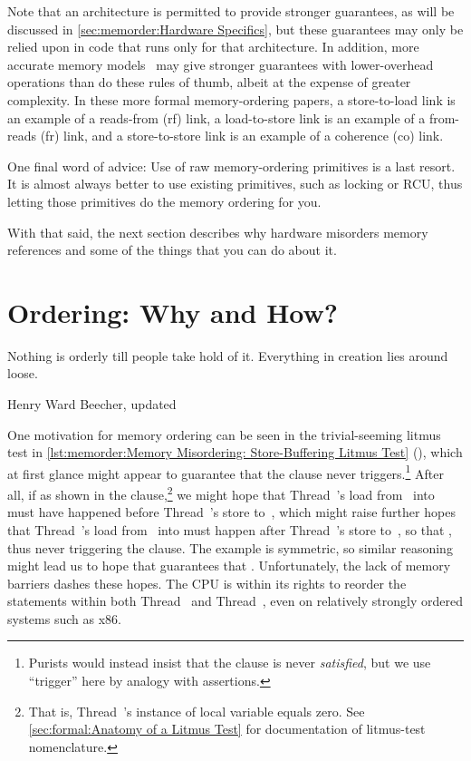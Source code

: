 Note that an architecture is permitted to provide stronger guarantees, as
will be discussed in
\cref{sec:memorder:Hardware Specifics},
but these guarantees may only be relied upon in code that runs only for
that architecture.
In addition, more accurate memory models~\cite{Alglave:2018:FSC:3173162.3177156}
may give stronger guarantees with lower-overhead operations than do
these rules of thumb, albeit at the expense of greater complexity.
In these more formal memory-ordering papers, a store-to-load link is an
example of a reads-from (rf) link, a load-to-store link is an example
of a from-reads (fr) link, and a store-to-store link is an example of
a coherence (co) link.

One final word of advice:
Use of raw memory-ordering primitives is a last resort.
It is almost always better to use existing primitives, such as locking
or RCU, thus letting those primitives do the memory ordering for you.

With that said, the next section describes why hardware misorders memory
references and some of the things that you can do about it.

\section{Ordering:
		   Why and How?}
\label{sec:memorder:Ordering: Why and How?}
%
\epigraph{Nothing is orderly till people take hold of it.
	  Everything in creation lies around loose.}
	 {Henry Ward Beecher, updated}

One motivation for memory ordering can be seen in the trivial-seeming
litmus test in
\cref{lst:memorder:Memory Misordering: Store-Buffering Litmus Test}
(),
which at first glance might
appear to guarantee that the  clause never triggers.\footnote{
	Purists would instead insist that the  clause is
	never \emph{satisfied}, but we use ``trigger'' here by
	analogy with assertions.}
After all, if  as shown in the  clause,\footnote{
	That is, Thread~'s instance of local variable 
	equals zero.
	See \cref{sec:formal:Anatomy of a Litmus Test}
	for documentation of litmus-test nomenclature.}
we might hope that Thread~'s load from~ into 
must have happened before Thread~'s store to~, which
might raise further hopes that Thread~'s load from~
into  must happen after Thread~'s store to~,
so that , thus never triggering the  clause.
The example is symmetric, so similar reasoning might lead
us to hope that  guarantees that .
Unfortunately, the lack of memory barriers dashes these hopes.
The CPU is within its rights to reorder
the statements within both Thread~ and Thread~,
even on relatively strongly ordered systems such as x86.

